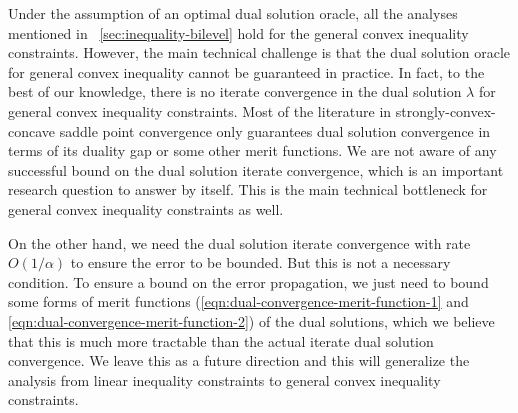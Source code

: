 \begin{remark}
    Under the assumption of an optimal dual solution oracle, all the analyses mentioned in ~\cref{sec:inequality-bilevel} hold for the general convex inequality constraints. However, the main technical challenge is that the dual solution oracle for general convex inequality cannot be guaranteed in practice.
    In fact, to the best of our knowledge, there is no iterate convergence in the dual solution $\lambda$ for general convex inequality constraints. Most of the literature in strongly-convex-concave saddle point convergence only guarantees dual solution convergence in terms of its duality gap or some other merit functions. We are not aware of any successful bound on the dual solution iterate convergence, which is an important research question to answer by itself.
    This is the main technical bottleneck for general convex inequality constraints as well.
\end{remark}
\begin{remark}
    On the other hand, we need the dual solution iterate convergence with rate $O(1/\alpha)$ to ensure the error to be bounded. But this is not a necessary condition. To ensure a bound on the error propagation, we just need to bound some forms of merit functions (\cref{eqn:dual-convergence-merit-function-1} and \cref{eqn:dual-convergence-merit-function-2}) of the dual solutions, which we believe that this is much more tractable than the actual iterate dual solution convergence. We leave this as a future direction and this will generalize the analysis from linear inequality constraints to general convex inequality constraints.
\end{remark}


